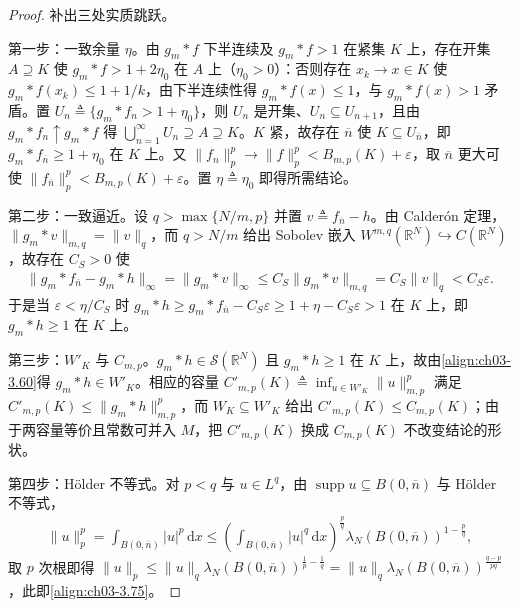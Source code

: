 \documentclass[../../main.tex]{subfiles}%
\begin{document}
\begin{proof}
补出三处实质跳跃。

第一步：一致余量 $\eta$。由 $g_m*f$ 下半连续及 $g_m*f>1$ 在紧集 $K$ 上，存在开集 $A\supseteq K$ 使 $g_m*f>1+2\eta_0$ 在 $A$ 上（$\eta_0>0$）：否则存在 $x_k\to x\in K$ 使 $g_m*f(x_k)\leqslant1+1/k$，由下半连续性得 $g_m*f(x)\leqslant1$，与 $g_m*f(x)>1$ 矛盾。置 $U_n\triangleq\{g_m*f_n>1+\eta_0\}$，则 $U_n$ 是开集、$U_n\subseteq U_{n+1}$，且由 $g_m*f_n\uparrow g_m*f$ 得 $\bigcup_{n=1}^\infty U_n\supseteq A\supseteq K$。$K$ 紧，故存在 $\overline n$ 使 $K\subseteq U_{\overline n}$，即 $g_m*f_{\overline n}\geqslant1+\eta_0$ 在 $K$ 上。又 $\|f_n\|_p^p\to\|f\|_p^p<B_{m,p}(K)+\varepsilon$，取 $\overline n$ 更大可使 $\|f_{\overline n}\|_p^p<B_{m,p}(K)+\varepsilon$。置 $\eta\triangleq\eta_0$ 即得所需结论。

第二步：一致逼近。设 $q>\max\{N/m,p\}$ 并置 $v\triangleq f_{\overline n}-h$。由 Calderón 定理，$\|g_m*v\|_{m,q}=\|v\|_q$，而 $q>N/m$ 给出 Sobolev 嵌入 $W^{m,q}(\mathbb{R}^N)\hookrightarrow C(\mathbb{R}^N)$，故存在 $C_S>0$ 使
\begin{align*}
\|g_m*f_{\overline n}-g_m*h\|_\infty=\|g_m*v\|_\infty\leqslant C_S\|g_m*v\|_{m,q}=C_S\|v\|_q<C_S\varepsilon.
\end{align*}
于是当 $\varepsilon<\eta/C_S$ 时 $g_m*h\geqslant g_m*f_{\overline n}-C_S\varepsilon\geqslant1+\eta-C_S\varepsilon>1$ 在 $K$ 上，即 $g_m*h\geqslant1$ 在 $K$ 上。

第三步：$W'_K$ 与 $C_{m,p}$。$g_m*h\in\mathcal{S}(\mathbb{R}^N)$ 且 $g_m*h\geqslant1$ 在 $K$ 上，故由\eqref{align:ch03-3.60}得 $g_m*h\in W'_K$。相应的容量 $C'_{m,p}(K)\triangleq\inf_{u\in W'_K}\|u\|_{m,p}^p$ 满足 $C'_{m,p}(K)\leqslant\|g_m*h\|_{m,p}^p$，而 $W_K\subseteq W'_K$ 给出 $C'_{m,p}(K)\leqslant C_{m,p}(K)$；由于两容量等价且常数可并入 $M$，把 $C'_{m,p}(K)$ 换成 $C_{m,p}(K)$ 不改变结论的形状。

第四步：Hölder 不等式。对 $p<q$ 与 $u\in L^q$，由 $\operatorname{supp}u\subseteq B(0,\overline n)$ 与 Hölder 不等式，
\begin{align*}
\|u\|_p^p=\int_{B(0,\overline n)}|u|^p\,\mathrm{d}x
\leqslant\left(\int_{B(0,\overline n)}|u|^q\,\mathrm{d}x\right)^{\frac pq}\lambda_N(B(0,\overline n))^{1-\frac pq},
\end{align*}
取 $p$ 次根即得 $\|u\|_p\leqslant\|u\|_q\lambda_N(B(0,\overline n))^{\frac1p-\frac1q}=\|u\|_q\lambda_N(B(0,\overline n))^{\frac{q-p}{pq}}$，此即\eqref{align:ch03-3.75}。
\end{proof}
\end{document}

